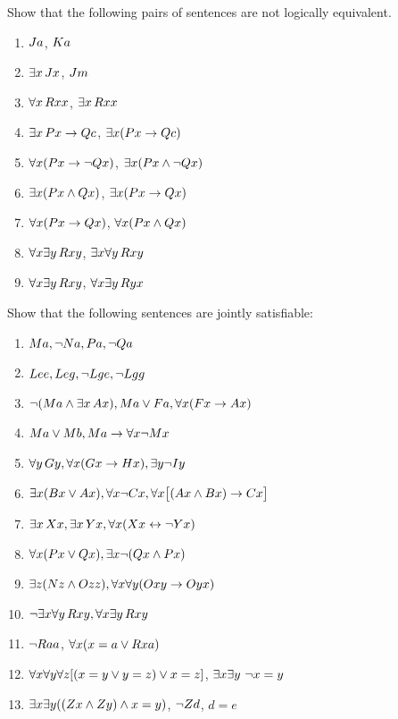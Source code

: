 \solutions
\problempart
\label{pr.NotEquiv}
Show that the following pairs of sentences are not logically equivalent.
\begin{enumerate}
\item $\mathord{J}a $,  $\mathord{K}a$
\item $\exists x\, \mathord{J}x$,  $\mathord{J}m$
\item $\forall x\, \mathord{R}xx$, $\exists x\, \mathord{R}xx$
\item $\exists x\, \mathord{P}x \rightarrow \mathord{Q}c$, $\exists x (\mathord{P}x \rightarrow \mathord{Q}c)$
\item $\forall x(\mathord{P}x \rightarrow \neg \mathord{Q}x)$, $\exists x(\mathord{P}x \wedge \neg \mathord{Q}x)$
\item $\exists x(\mathord{P}x \wedge \mathord{Q}x)$, $\exists x(\mathord{P}x \rightarrow \mathord{Q}x)$
\item $\forall x(\mathord{P}x\rightarrow \mathord{Q}x)$, $\forall x(\mathord{P}x \wedge \mathord{Q}x)$
\item $\forall x\exists y\, \mathord{R}xy$, $\exists x\forall y\, \mathord{R}xy$
\item $\forall x\exists y\, \mathord{R}xy$, $\forall x\exists y\, \mathord{R}yx$
\end{enumerate}

\problempart
Show that the following sentences are jointly satisfiable:
\begin{enumerate}
\item  $\mathord{M}a, \neg \mathord{N}a, \mathord{P}a, \neg \mathord{Q}a$
\item $\mathord{L}ee, \mathord{L}eg, \neg \mathord{L}ge, \neg \mathord{L}gg$
\item $\neg (\mathord{M}a \wedge \exists x\, \mathord{A}x), \mathord{M}a \vee \mathord{F}a, \forall x(\mathord{F}x \rightarrow \mathord{A}x)$
\item $\mathord{M}a \vee \mathord{M}b, \mathord{M}a \rightarrow \forall x \neg \mathord{M}x$
\item $\forall y\, \mathord{G}y, \forall x (\mathord{G}x \rightarrow \mathord{H}x), \exists y \neg \mathord{I}y$
\item $\exists x(\mathord{B}x \vee \mathord{A}x), \forall x \neg \mathord{C}x, \forall x\bigl[(\mathord{A}x \wedge \mathord{B}x) \rightarrow \mathord{C}x\bigr]$
\item $\exists x\, \mathord{X}x, \exists x\, \mathord{Y}x, \forall x(\mathord{X}x \leftrightarrow \neg \mathord{Y}x)$
\item $\forall x(\mathord{P}x \vee \mathord{Q}x), \exists x\neg(\mathord{Q}x \wedge \mathord{P}x)$
\item $\exists z(\mathord{N}z \wedge \mathord{O}zz), \forall x\forall y(\mathord{O}xy \rightarrow \mathord{O}yx)$
\item $\neg \exists x \forall y\, \mathord{R}xy, \forall x \exists y\, \mathord{R}xy$
\item $\neg \mathord{R}aa$, $\forall x (x=a \vee \mathord{R}xa)$
\item $\forall x\forall y\forall z[(x=y \vee y=z )\vee x=z]$, $\exists x\exists y\ \enot x= y$
\item $\exists x\exists y((\mathord{Z}x \wedge \mathord{Z}y )\wedge x=y)$, $\neg \mathord{Z}d$, $d=e$
\end{enumerate}

